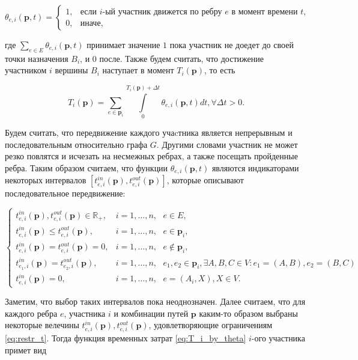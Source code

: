 \documentclass[12pt, a4paper]{article}
\begin{document}
$$
\theta_{e, i} (\textbf{p}, t) =
\begin{cases}
	1, & \text{если }  i\text{-ый участник движется по ребру $e$ в момент времени $t$,}  \\
	0, & \text{иначе},
\end{cases}
$$

где $\sum\limits_{e \in E} \theta_{e, i} (\textbf{p}, t)$ принимает значение $1$ пока участник не доедет до своей точки назначения $B_i$, и $0$ после. Также будем считать, что достижение  участником $i$ вершины $B_i$ наступает в момент $T_i(\textbf{p})$, то есть 
	
\begin{equation}
	\label{eq:T_i_by_theta}
	T_i(\textbf{p}) = \sum \limits_{e \in \textbf{p}_i} \int\limits_{0}^{T_i(\textbf{p}) + \Delta t} \theta_{e, i} (\textbf{p}, t) dt, \forall \Delta t > 0.
\end{equation}

Будем считать, что передвижение каждого учаcтника является непрерывным и последовательным относительно графа $G$. Другими словами участник не может резко повлятся и исчезать на несмежных ребрах, а также посещать пройденные ребра. Таким образом считаем, что функции $\theta_{e, i} (\textbf{p}, t)$ являются индикаторами некоторых интервалов $[t_{e, i}^{in} (\textbf{p}), t_{e, i}^{out} (\textbf{p})]$, которые описывают последовательное передвижение:

\begin{equation}
	\label{eq:restr_t}
	\begin{cases}
		t_{e, i}^{in}(\textbf{p}), t_{e, i}^{out}(\textbf{p}) \in \mathbb{R}_+,  & i = 1, \dots, n, \text{ } e \in E, \\
		t_{e, i}^{in}(\textbf{p}) \le t_{e, i}^{out}(\textbf{p}), & i = 1, \dots, n, \text{ } e \in \textbf{p}_i,  \\
		t_{e, i}^{in}(\textbf{p}) = t_{e, i}^{out}(\textbf{p}) = 0, & i = 1, \dots, n, \text{ } e \notin \textbf{p}_i, \\
		t_{e_1, i}^{in} (\textbf{p}) = t_{e_2, i}^{out} (\textbf{p}), & i = 1, \dots, n, \text{ } e_1, e_2 \in \textbf{p}_i, \exists A, B, C \in V: e_1 = (A, B), e_2 = (B, C)\\
		t_{e, i}^{in} (\textbf{p}) = 0, & i = 1, \dots, n, \text{ } e = (A_i, X), X \in V.
	\end{cases}
\end{equation}

Заметим, что выбор таких интервалов пока неоднозначен. Далее считаем, что для каждого ребра $e$, участника $i$ и комбинации путей $\textbf{p}$ каким-то образом выбраны некоторые велечины $t_{e, i}^{in}(\textbf{p}), t_{e, i}^{out}(\textbf{p})$, удовлетворяющие ограничениям \ref{eq:restr_t}. Тогда функция временных затрат \eqref{eq:T_i_by_theta} $i$-ого участника примет вид
\end{document}
